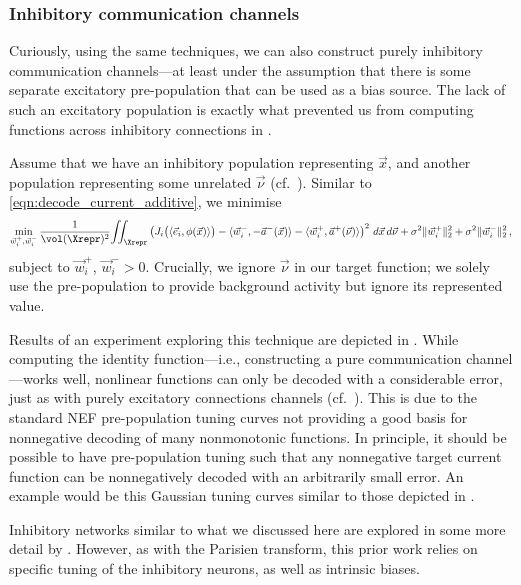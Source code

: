 \subsubsection{Inhibitory communication channels}
Curiously, using the same techniques, we can also construct purely inhibitory communication channels---at least under the assumption that there is some separate excitatory pre-population that can be used as a bias source.
The lack of such an excitatory population is exactly what prevented us from computing functions across inhibitory connections in .

Assume that we have an inhibitory population representing $\vec x$, and another population representing some unrelated $\vec \nu$ (cf.~).
Similar to \cref{eqn:decode_current_additive}, we minimise
\begin{align*}
	\min_{\vec w_i^+, \vec w_i^-}
	\frac{1}{\vol(\Xrepr)^2} \! \iint_{\Xrepr}
	\left(
		J_i\bigl(\langle \vec e_i, \phi(\vec x) \rangle\bigr)
		- \langle \vec w^-_i, -\vec a^-(\vec x) \rangle
		- \langle \vec w^+_i, \vec a^+(\vec \nu) \rangle
	\right)^2 \, d\vec x \, d\vec \nu + \sigma^2 \|\vec w_{i}^+\|_2^2 + \sigma^2 \|\vec w_{i}^-\|_2^2 \,,
\end{align*}
subject to $\vec w_{i}^+$, $\vec w_{i}^- > 0$.
Crucially, we ignore $\vec \nu$ in our target function; we solely use the pre-population to provide background activity but ignore its represented value.

Results of an experiment exploring this technique are depicted in .
While computing the identity function---i.e., constructing a pure communication channel---works well, nonlinear functions can only be decoded with a considerable error, just as with purely excitatory connections channels (cf.~).
This is due to the standard NEF pre-population tuning curves not providing a good basis for nonnegative decoding of many nonmonotonic functions.
In principle, it should be possible to have pre-population tuning such that any nonnegative target current function can be nonnegatively decoded with an arbitrarily small error.
An example would be this Gaussian tuning curves similar to those depicted in .

Inhibitory networks similar to what we discussed here are explored in some more detail by \citet{tripp2016function}.
However, as with the Parisien transform, this prior work relies on specific tuning of the inhibitory neurons, as well as intrinsic biases.

